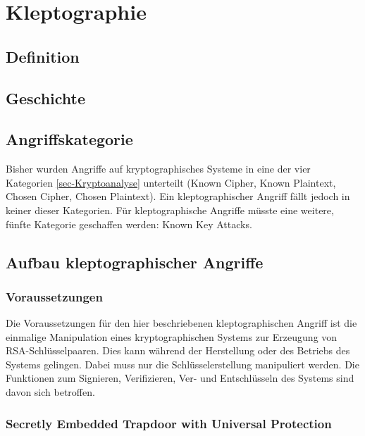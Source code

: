 \chapter{Kleptographie}
    \section{Definition}


    \section{Geschichte}

    \section{Angriffskategorie}
        Bisher wurden Angriffe auf kryptographisches Systeme in eine der vier Kategorien \ref{sec-Kryptoanalyse} unterteilt (Known Cipher, Known Plaintext, Chosen Cipher, Chosen Plaintext). Ein kleptographischer Angriff fällt jedoch in keiner dieser Kategorien. Für kleptographische Angriffe müsste eine weitere, fünfte Kategorie geschaffen werden: Known Key Attacks. 

    \section{Aufbau kleptographischer Angriffe}
    

        \subsection{Voraussetzungen} 
        Die Voraussetzungen für den hier beschriebenen kleptographischen Angriff ist die einmalige Manipulation eines kryptographischen Systems zur Erzeugung von \ac{RSA}-Schlüsselpaaren. Dies kann während der Herstellung oder des Betriebs des Systems gelingen. Dabei muss nur die Schlüsselerstellung manipuliert werden. Die Funktionen zum Signieren, Verifizieren, Ver- und Entschlüsseln des Systems sind davon sich betroffen.


        \subsection{Secretly Embedded Trapdoor with Universal Protection}

